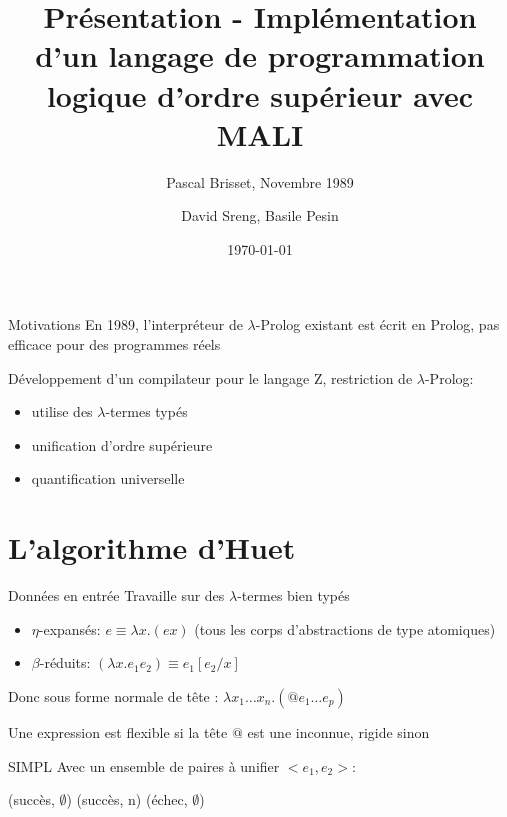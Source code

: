 \documentclass[aspectratio=169]{beamer}
\title{Présentation - Implémentation d’un langage de programmation logique d’ordre supérieur avec MALI}
\subtitle{Pascal Brisset, Novembre 1989}
\date{\today}
\author{David Sreng, Basile Pesin}
\institute{Faculté des Sciences de Sorbonne Université}
\begin{document}

\lstset{basicstyle=\tt\footnotesize, frame=single}

\maketitle

\begin{frame}{Motivations}
  En 1989, l'interpréteur de $\lambda$-Prolog existant est écrit en Prolog, pas efficace pour des programmes réels

  Développement d'un compilateur pour le langage Z, restriction de $\lambda$-Prolog:
  \begin{itemize}
    \item utilise des $\lambda$-termes typés
    \item unification d'ordre supérieure
    \item quantification universelle
  \end{itemize}
\end{frame}

\section{L'algorithme d'Huet}

\begin{frame}{Données en entrée}
  Travaille sur des $\lambda$-termes bien typés
  \begin{itemize}
    \item $\eta$-expansés: $e \equiv \lambda x.(e x)$ (tous les corps d'abstractions de type atomiques)
    \item $\beta$-réduits: $(\lambda x . e_1 e_2) \equiv e_1[e_2/x]$
  \end{itemize}
  Donc sous forme normale de tête : $\lambda x_1 \ldots x_n . (@ e_1 \ldots e_p)$

  Une expression est flexible si la tête $@$ est une inconnue, rigide sinon
\end{frame}

\begin{frame}{SIMPL}
  Avec un ensemble de paires à unifier $<e_1, e_2>$:
  \begin{algorithmic}
     (succès, $\emptyset$)
    \EndIf
     (succès, n)
    \EndIf
     (échec, $\emptyset$)
    \Else
    \EndIf
    \EndIf
    \EndProcedure
  \end{algorithmic}
\end{frame}
\end{document}
